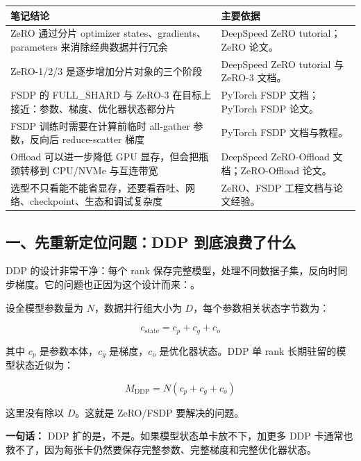 \begin{center}
{\small
\begin{tabular}{p{3.7cm}p{9cm}}
\hline
\textbf{笔记结论} & \textbf{主要依据} \\
\hline
ZeRO 通过分片 optimizer states、gradients、parameters 来消除经典数据并行冗余 & DeepSpeed ZeRO tutorial；ZeRO 论文。 \\
ZeRO-1/2/3 是逐步增加分片对象的三个阶段 & DeepSpeed ZeRO tutorial 与 ZeRO-3 文档。 \\
FSDP 的 FULL\_SHARD 与 ZeRO-3 在目标上接近：参数、梯度、优化器状态都分片 & PyTorch FSDP 文档；PyTorch FSDP 论文。 \\
FSDP 训练时需要在计算前临时 all-gather 参数，反向后 reduce-scatter 梯度 & PyTorch FSDP 文档与教程。 \\
Offload 可以进一步降低 GPU 显存，但会把瓶颈转移到 CPU/NVMe 与互连带宽 & DeepSpeed ZeRO-Offload 文档；ZeRO-Offload 论文。 \\
选型不只看能不能省显存，还要看吞吐、网络、checkpoint、生态和调试复杂度 & ZeRO、FSDP 工程文档与论文经验。 \\
\hline
\end{tabular}
}
\end{center}

\subsection{一、先重新定位问题：DDP 到底浪费了什么}

DDP 的设计非常干净：每个 rank 保存完整模型，处理不同数据子集，反向时同步梯度。它的问题也正因为这个设计而来：。

设全模型参数量为 $N$，数据并行组大小为 $D$，每个参数相关状态字节数为：

\[
c_{\text{state}} = c_p + c_g + c_o
\]

其中 $c_p$ 是参数本体，$c_g$ 是梯度，$c_o$ 是优化器状态。DDP 单 rank 长期驻留的模型状态近似为：

\[
M_{\text{DDP}} = N(c_p + c_g + c_o)
\]

这里没有除以 $D$。这就是 ZeRO/FSDP 要解决的问题。

\begin{warnbox}
\textbf{一句话：} DDP 扩的是，不是。如果模型状态单卡放不下，加更多 DDP 卡通常也救不了，因为每张卡仍然要保存完整参数、完整梯度和完整优化器状态。
\end{warnbox}

